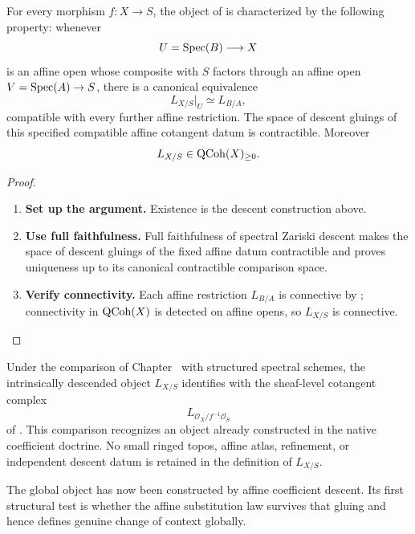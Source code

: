 \begin{theorem}
\label{thm:global-cotangent-classifier}
For every morphism \(f:X\to S\), the object of
 is characterized by the following
property: whenever
\[
    U=\operatorname{Spec}(B)\longrightarrow X
\]
is an affine open whose composite with \(S\) factors through an affine open
\(V=\operatorname{Spec}(A)\to S\), there is a canonical equivalence
\[
    L_{X/S}|_U
    \simeq
    L_{B/A},
\]
compatible with every further affine restriction. The space of descent gluings of this specified compatible affine cotangent
datum is contractible. Moreover
\[
    L_{X/S}\in\operatorname{QCoh}(X)_{\geq0}.
\]
\end{theorem}

\begin{proof}
\leavevmode
\begin{enumerate}[label=\textup{(\arabic*)}]
    \item \textbf{Set up the argument.}
    Existence is the descent construction above.

    \item \textbf{Use full faithfulness.}
    Full faithfulness of spectral Zariski descent makes the space of descent gluings of the
    fixed affine datum contractible and proves uniqueness up to its canonical contractible
    comparison space.

    \item \textbf{Verify connectivity.}
    Each affine restriction \(L_{B/A}\) is connective by ;
    connectivity in \(\operatorname{QCoh}(X)\) is detected on affine opens, so \(L_{X/S}\) is connective.
\end{enumerate}
\end{proof}

\begin{remark}
\label{rem:global-cotangent-intrinsic}
Under the comparison of
Chapter~ with structured spectral
schemes, the intrinsically descended object \(L_{X/S}\) identifies with the
sheaf-level cotangent complex
\[
    L_{\mathcal O_X/f^{-1}\mathcal O_S}
\]
of \cite{LurieSAG}. This comparison recognizes an object already constructed
in the native coefficient doctrine. No small ringed topos, affine atlas,
refinement, or independent descent datum is retained in the definition of
\(L_{X/S}\).
\end{remark}
The global object has now been constructed by affine coefficient descent. Its
first structural test is whether the affine substitution law survives that
gluing and hence defines genuine change of context globally.

